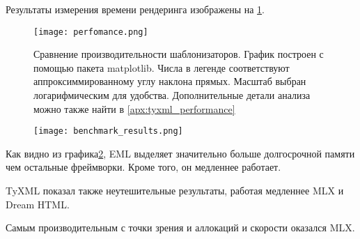 Результаты измерения времени рендеринга изображены на \ref{fig:perfomance}.

\begin{figure}[h!]
    \texttt{[image: perfomance.png]}
    \caption{Сравнение производительности шаблонизаторов. График построен с помощью пакета matplotlib. Числа в легенде соответствуют аппроксиммированному углу наклона прямых. Масштаб выбран логарифмическим для удобства. Дополнительные детали анализа можно также найти в \ref{apx:tyxml_performance}}
    \label{fig:perfomance}
\end{figure}

\begin{figure}[h!]
    \texttt{[image: benchmark\_results.png]}
    \caption{}
    \label{fig:bench-performance}
\end{figure}

Как видно из графика\ref{fig:bench-performance}, EML выделяет значительно больше долгосрочной памяти чем остальные фреймворки.
Кроме того, он медленнее работает.

TyXML показал также неутешительные результаты, работая медленнее MLX и Dream HTML.

Самым производительным с точки зрения и аллокаций и скорости оказался MLX.


